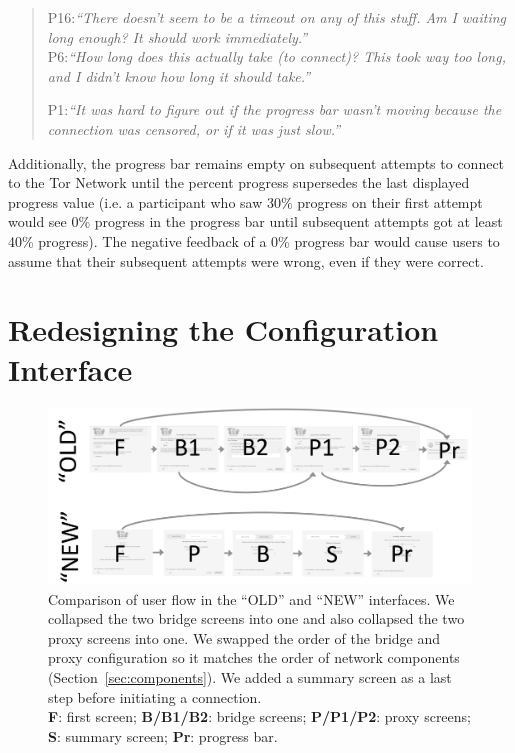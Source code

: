 \documentclass[USenglish,oneside,twocolumn]{article}
\begin{document}
\begin{quotation}
\noindent P16:\textit{``There doesn't seem to be a timeout on any of this stuff. Am I waiting long enough? It should work immediately.''}\\

\noindent P6:\textit{``How long does this actually take (to connect)? This took way too long, and I didn't know how long it should take.''}

\noindent P1:\textit{``It was hard to figure out if the progress bar wasn't moving because the connection was censored, or if it was just slow.''}
\end{quotation}

Additionally, the progress bar remains empty on subsequent attempts to connect to the Tor Network until the percent progress supersedes the last displayed progress value (i.e. a participant who saw 30\% progress on their first attempt would see 0\% progress in the progress bar until subsequent attempts got at least 40\% progress). The negative feedback of a 0\% progress bar would cause users to assume that their subsequent attempts were wrong, even if they were correct. 

\section{Redesigning the Configuration Interface}

\begin{figure}[t]
\centering
\includegraphics[width=.85\textwidth]{old-and-new-flows.png}
\caption{
Comparison of user flow in the ``OLD'' and ``NEW'' interfaces.
We collapsed the two bridge screens into one 
and also collapsed the two proxy screens into one.
We swapped the order of the bridge and proxy configuration
so it matches the order of network components (Section~\ref{sec:components}).
We added a summary screen as a last step before initiating a connection.\\
\textbf{F}: first screen;
\textbf{B/B1/B2}: bridge screens;
\textbf{P/P1/P2}: proxy screens;
\textbf{S}: summary screen;
\textbf{Pr}: progress bar.
}
\label{fig:flow}
\end{figure} 
\end{document}
